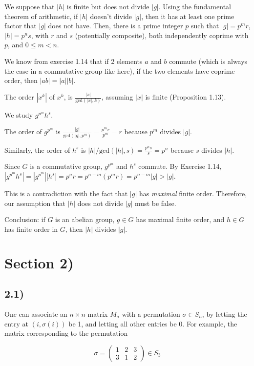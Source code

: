 \documentclass[12pt, letterpaper, twoside]{report}
\begin{document}
We suppose that $|h|$ is finite but does not divide $|g|$. Using the fundamental theorem of arithmetic, if $|h|$ doesn't divide $|g|$, then it has at least one prime factor that $|g|$ does not have. Then, there is a prime integer $p$ such that $|g| = p^m r$, $|h| = p^n s$, with $r$ and $s$ (potentially composite), both independently coprime with $p$, and $0 \leq m < n$.

We know from exercise 1.14 that if 2 elements $a$ and $b$ commute (which is always the case in a commutative group like here), if the two elements have coprime order, then $|ab| = |a||b|$.

The order $|x^k|$ of $x^k$, is $\frac{|x|}{\text{gcd}(|x|, k)}$, assuming $|x|$ is finite (Proposition 1.13).

We study $g^{p^m} h^s$. 

The order of $g^{p^m}$ is $\frac{|g|}{\text{gcd}(|g|, p^m)} = \frac{p^m r}{p^m} = r$ because $p^m$ divides $|g|$.

Similarly, the order of $h^s$ is $|h|/\text{gcd}(|h|, s) = \frac{p^n s}{s} = p^n$ because $s$ divides $|h|$.

Since $G$ is a commutative group, $g^{p^m}$ and $h^s$ commute. By Exercise 1.14, $|g^{p^m} h^s| = |g^{p^m}| |h^s| = p^n r = p^{n-m} (p^m r) = p^{n-m} |g| > |g|$.

This is a contradiction with the fact that $|g|$ has \textit{maximal} finite order. Therefore, our assumption that $|h|$ does not divide $|g|$ must be false.

Conclusion: if $G$ is an abelian group, $g \in G$ has maximal finite order, and $h \in G$ has finite order in $G$, then $|h|$ divides $|g|$.
\section*{Section 2)}

\subsection*{2.1)}

One can associate an $n \times n$ matrix $M_\sigma$ with a permutation $\sigma \in S_n$, by letting the entry at $(i, \sigma(i))$ be 1, and letting all other entries be 0. For example, the matrix corresponding to the permutation

\begin{equation}
\sigma =
	\begin{pmatrix}
		1 & 2 & 3 \\
		3 & 1 & 2
	\end{pmatrix}
\in S_3
\end{equation}
\end{document}
